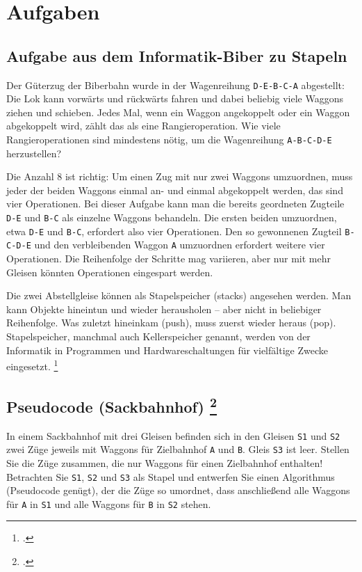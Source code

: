 \documentclass{lehramt-informatik}
\begin{document}
\chapter{Aufgaben}

\section{Aufgabe aus dem Informatik-Biber zu Stapeln}

Der Güterzug der Biberbahn wurde in der Wagenreihung \verb|D-E-B-C-A|
abgestellt: Die Lok kann vorwärts und rückwärts fahren und dabei
beliebig viele Waggons ziehen und schieben. Jedes Mal, wenn ein Waggon
angekoppelt oder ein Waggon abgekoppelt wird, zählt das als eine
Rangieroperation. Wie viele Rangieroperationen sind mindestens nötig, um
die Wagenreihung \verb|A-B-C-D-E| herzustellen?

Die Anzahl 8 ist richtig: Um einen Zug mit nur zwei Waggons umzuordnen,
muss jeder der beiden Waggons einmal an- und einmal abgekoppelt werden,
das sind vier Operationen. Bei dieser Aufgabe kann man die bereits
geordneten Zugteile \verb|D-E| und \verb|B-C| als einzelne Waggons
behandeln. Die ersten beiden umzuordnen, etwa \verb|D-E| und \verb|B-C|,
erfordert also vier Operationen. Den so gewonnenen Zugteil
\verb|B-C-D-E| und den verbleibenden Waggon \verb|A| umzuordnen
erfordert weitere vier Operationen. Die Reihenfolge der Schritte mag
variieren, aber nur mit mehr Gleisen könnten Operationen eingespart
werden.

Die zwei Abstellgleise können als Stapelspeicher (stacks) angesehen
werden. Man kann Objekte hineintun und wieder herausholen – aber nicht
in beliebiger Reihenfolge. Was zuletzt hineinkam (push), muss zuerst
wieder heraus (pop). Stapelspeicher, manchmal auch Kellerspeicher
genannt, werden von der Informatik in Programmen und Hardwareschaltungen
für vielfältige Zwecke eingesetzt.
\footcite[Seite 23]{net:pdf:informatik-biber-2012}

%

\section{Pseudocode (Sackbahnhof)
\footcite[Seite 3, Aufgabe 4: Stack]{aud:ab:7}}

In einem Sackbahnhof mit drei Gleisen befinden sich in den Gleisen
\texttt{S1} und \texttt{S2} zwei Züge jeweils mit Waggons für
Zielbahnhof \texttt{A} und \texttt{B}. Gleis \texttt{S3} ist leer.
Stellen Sie die Züge zusammen, die nur Waggons für einen Zielbahnhof
enthalten! Betrachten Sie \texttt{S1}, \texttt{S2} und \texttt{S3} als
Stapel und entwerfen Sie einen Algorithmus (Pseudocode genügt), der die
Züge so umordnet, dass anschließend alle Waggons für \texttt{A} in
\texttt{S1} und alle Waggons für \texttt{B} in \texttt{S2} stehen.
\end{document}
